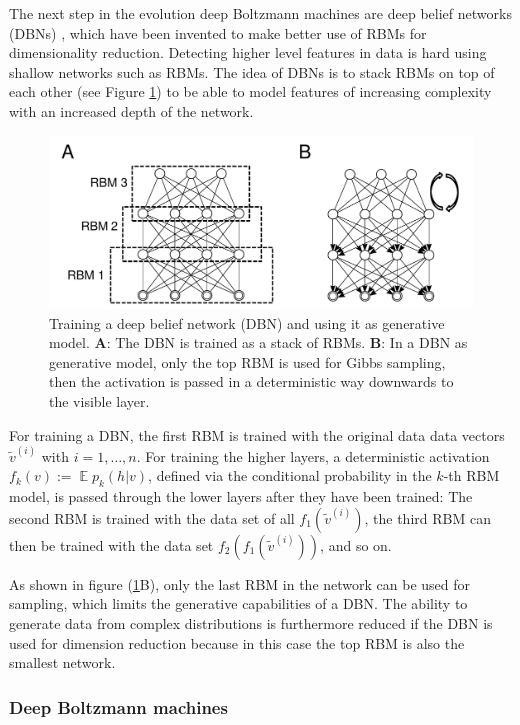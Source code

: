 \documentclass[12pt]{article}
\DeclareMathOperator{\EX}{\mathbb{E}}
\begin{document}
The next step in the evolution deep Boltzmann machines are deep belief networks (DBNs) \citep{hinton_reducing_2006}, which have been invented to make better use of RBMs for dimensionality reduction.
Detecting higher level features in data is hard using shallow networks such as RBMs.
The idea of DBNs is to stack RBMs on top of each other (see Figure \ref{fig:dbn}) to be able to model features of increasing complexity with an increased depth of the network.

\begin{figure}[h]
   \centering
   \includegraphics[scale=0.7]{images/dbn.pdf}
   \caption{Training a deep belief network (DBN) and using it as generative model.
   {\bf A}: The DBN is trained as a stack of RBMs. {\bf B}: In a DBN as generative model, only the top RBM is used for Gibbs sampling, then the activation is passed in a deterministic way downwards to the visible layer.}
   \label{fig:dbn}
 \end{figure}

For training a DBN, the first RBM is trained with the original data data vectors $\tilde{v}^{(i)}$ with $i = 1, \dots, n$.
For training the higher layers, a deterministic activation $f_k(v) :=  \EX p_k(h|v)$, defined via the conditional probability in the $k$-th RBM model, is passed through the lower layers after they have been trained:
The second RBM is trained with the data set of all $f_1(\tilde{v}^{(i)})$, the third RBM can then be trained with the data set $f_2(f_1(\tilde{v}^{(i)}))$, and so on.

As shown in figure (\ref{fig:dbn}B), only the last RBM in the network can be used for sampling, which limits the generative capabilities of a DBN.
The ability to generate data from complex distributions is furthermore reduced if the DBN is used for dimension reduction because in this case the top RBM is also the smallest network.


\subsubsection{Deep Boltzmann machines}\label{dbmprobs}
\end{document}
